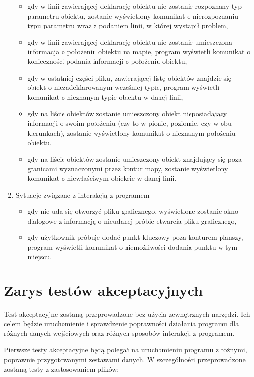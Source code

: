 \documentclass[a4paper,12pt]{article}
\newcommand\tab[1][0.6cm]{\hspace*{#1} }
\begin{document}
\begin{enumerate}
\begin{itemize}
\item gdy w linii zawierającej deklarację obiektu nie zostanie rozpoznany typ parametru obiektu, zostanie wyświetlony komunikat o nierozpoznaniu typu parametru wraz z podaniem linii, w której wystąpił problem,
\item gdy w linii zawierającej deklarację obiektu nie zostanie umieszczona informacja o położeniu obiektu na mapie, program wyświetli komunikat o konieczności podania informacji o położeniu obiektu,
\item gdy w ostatniej części pliku, zawierającej listę obiektów znajdzie się obiekt o niezadeklarowanym wcześniej typie, program wyświetli komunikat o nieznanym typie obiektu w danej linii,
\item gdy na liście obiektów zostanie umieszczony obiekt nieposiadający informacji o swoim położeniu (czy to w pionie, poziomie, czy w obu kierunkach), zostanie wyświetlony komunikat o nieznanym położeniu obiektu, 
\item gdy na liście obiektów zostanie umieszczony obiekt znajdujący się poza granicami wyznaczonymi przez kontur mapy, zostanie wyświetlony komunikat o niewłaściwym obiekcie w danej linii.

\end{itemize}

\item Sytuacje związane z interakcją z programem
\begin{itemize}
\item gdy nie uda się otworzyć pliku graficznego, wyświetlone zostanie okno dialogowe z informacją o nieudanej próbie otwarcia pliku graficznego,
\item gdy użytkownik próbuje dodać punkt kluczowy poza konturem planszy, program wyświetli komunikat o niemożliwości dodania punktu w tym miejscu.
\end{itemize}
\end{enumerate}

\section{Zarys testów akceptacyjnych}

\tab Test akceptacyjne zostaną przeprowadzone bez użycia zewnętrznych narzędzi. Ich celem będzie uruchomienie i sprawdzenie poprawności działania programu dla różnych danych wejściowych oraz różnych sposobów interakcji z programem.

Pierwsze testy akceptacyjne będą polegać na uruchomieniu programu z różnymi, poprawnie przygotowanymi zestawami danych. W szczególności przeprowadzone zostaną testy z zastosowaniem plików:
\end{document}
